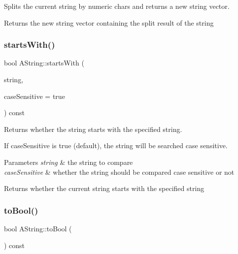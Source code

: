 Splits the current string by numeric chars and returns a new string vector. 

\begin{DoxyReturn}{Returns}
the new string vector containing the split result of the string 
\end{DoxyReturn}
\mbox{\label{class_a_string_aef584231c6ddc8925fbfa92ccf22cf53}} 
\subsubsection{\texorpdfstring{startsWith()}{startsWith()}}
{\footnotesize\ttfamily bool A\+String\+::starts\+With (\begin{DoxyParamCaption}\item[{const \mbox{\hyperlink{class_a_string}{A\+String}} \&}]{string,  }\item[{bool}]{case\+Sensitive = {\ttfamily true} }\end{DoxyParamCaption}) const}



Returns whether the string starts with the specified string. 

If case\+Sensitive is true (default), the string will be searched case sensitive.


\begin{DoxyParams}{Parameters}
{\em string} & the string to compare \\
\hline
{\em case\+Sensitive} & whether the string should be compared case sensitive or not \\
\hline
\end{DoxyParams}
\begin{DoxyReturn}{Returns}
whether the current string starts with the specified string 
\end{DoxyReturn}
\mbox{\label{class_a_string_addea3a08682e1875b48d679f30f539cb}} 
\subsubsection{\texorpdfstring{toBool()}{toBool()}}
{\footnotesize\ttfamily bool A\+String\+::to\+Bool (\begin{DoxyParamCaption}{ }\end{DoxyParamCaption}) const}



